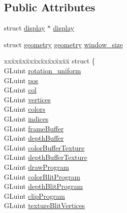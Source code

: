 \subsection*{Public Attributes}
\begin{DoxyCompactItemize}
\item 
struct \hyperlink{structdisplay}{display} $\ast$ \hyperlink{structwindow_a129486f2bd23791194f389ca1405cfd4}{display}
\item 
struct \hyperlink{structgeometry}{geometry} \hyperlink{structgeometry}{geometry} \hyperlink{structwindow_ad2b6c8ed8044b41fd1189a0ce26d539a}{window\-\_\-size}
\item 
\begin{tabbing}
xx\=xx\=xx\=xx\=xx\=xx\=xx\=xx\=xx\=\kill
struct \{\\
\>GLuint \hyperlink{structwindow_a5202f3b60e262a6fa4fcee68dd47cb67}{rotation\_uniform}\\
\>GLuint \hyperlink{structwindow_aaf965f90f9fc938db2315ff62028c362}{pos}\\
\>GLuint \hyperlink{structwindow_aef10fe94766ccd4831ee611c5ad0e55c}{col}\\
\>GLuint \hyperlink{structwindow_aba37ddff444b6d79b605215db77dfd5d}{vertices}\\
\>GLuint \hyperlink{structwindow_a707aa023203655374dc8ee1425ad81c5}{colors}\\
\>GLuint \hyperlink{structwindow_a669d3d1d362ac34ddc5dfcc7dd4bc258}{indices}\\
\>GLuint \hyperlink{structwindow_a5e3810549f0160f18cef64c93bdd8278}{frameBuffer}\\
\>GLuint \hyperlink{structwindow_af72060df9155bae3d293b91993e35bda}{depthBuffer}\\
\>GLuint \hyperlink{structwindow_ac0b91590483870dc5f0b20c09b53fed7}{colorBufferTexture}\\
\>GLuint \hyperlink{structwindow_a747c753851bb1eca93c472367eca55a3}{depthBufferTexture}\\
\>GLuint \hyperlink{structwindow_a0bd2bc43c368909c5715ed148325083e}{drawProgram}\\
\>GLuint \hyperlink{structwindow_afcddaf6e638b4372072dbcb758cadc3d}{colorBlitProgram}\\
\>GLuint \hyperlink{structwindow_acd8864dbabe48d600ede80ce22fc4704}{depthBlitProgram}\\
\>GLuint \hyperlink{structwindow_adc05c7be01b19a77722ce274ec53e93b}{clipProgram}\\
\>GLuint \hyperlink{structwindow_a38cefb56177a697abbd43518de429a61}{textureBlitVertices}\\

\end{tabbing}
\end{DoxyCompactItemize}
